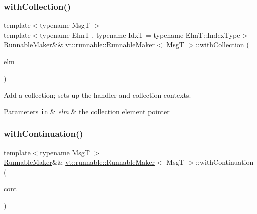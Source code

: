 \subsubsection{\texorpdfstring{with\+Collection()}{withCollection()}}
{\footnotesize\ttfamily template$<$typename MsgT $>$ \\
template$<$typename ElmT , typename IdxT  = typename Elm\+T\+::\+Index\+Type$>$ \\
\hyperlink{structvt_1_1runnable_1_1_runnable_maker}{Runnable\+Maker}\&\& \hyperlink{structvt_1_1runnable_1_1_runnable_maker}{vt\+::runnable\+::\+Runnable\+Maker}$<$ MsgT $>$\+::with\+Collection (\begin{DoxyParamCaption}\item[{ElmT $\ast$}]{elm }\end{DoxyParamCaption})\hspace{0.3cm}{\ttfamily [inline]}}



Add a collection; sets up the handler and collection contexts. 


\begin{DoxyParams}[1]{Parameters}
\mbox{\tt in}  & {\em elm} & the collection element pointer \\
\hline
\end{DoxyParams}
\mbox{\label{structvt_1_1runnable_1_1_runnable_maker_aa547117a9c2e36d77f60712ec78eef58}} 
\subsubsection{\texorpdfstring{with\+Continuation()}{withContinuation()}}
{\footnotesize\ttfamily template$<$typename MsgT $>$ \\
\hyperlink{structvt_1_1runnable_1_1_runnable_maker}{Runnable\+Maker}\&\& \hyperlink{structvt_1_1runnable_1_1_runnable_maker}{vt\+::runnable\+::\+Runnable\+Maker}$<$ MsgT $>$\+::with\+Continuation (\begin{DoxyParamCaption}\item[{\hyperlink{namespacevt_ae0a5a7b18cc99d7b732cb4d44f46b0f3}{Action\+Type}}]{cont }\end{DoxyParamCaption})\hspace{0.3cm}{\ttfamily [inline]}}



